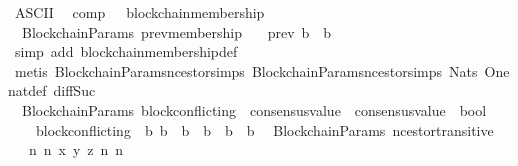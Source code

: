 \begin{isabellebody}
\isanewline
{}\isamarkupfalse%
\ {\isacharparenleft}ASCII{\isacharparenright}\isanewline
\ \ comp\ \ {\isacharparenleft}\ {\isachardoublequoteopen}blockchain{\isacharunderscore}membership{\isachardoublequoteclose}\ {}{}{\isacharparenright}\isanewline
\isanewline
{}\isamarkupfalse%
\ {\isacharparenleft}\ BlockchainParams{\isacharparenright}\ prev{\isacharunderscore}membership\ {\isacharcolon}\isanewline
\ \ {\isachardoublequoteopen}prev\ b\ {\isasymdownharpoonright}\ b{\isachardoublequoteclose}\isanewline
%
\isadelimproof
\ \ %
\endisadelimproof
%
\isatagproof
{}\isamarkupfalse%
\ {\isacharparenleft}simp\ add{\isacharcolon}\ blockchain{\isacharunderscore}membership{\isacharunderscore}def{\isacharparenright}\isanewline
\ \ \isamarkupfalse%
\ {\isacharparenleft}metis\ BlockchainParams{\isachardot}n{\isacharunderscore}cestor{\isachardot}simps{\isacharparenleft}{}{\isacharparenright}\ BlockchainParams{\isachardot}n{\isacharunderscore}cestor{\isachardot}simps{\isacharparenleft}{}{\isacharparenright}\ Nats{\isacharunderscore}{}\ One{\isacharunderscore}nat{\isacharunderscore}def\ diff{\isacharunderscore}Suc{\isacharunderscore}{}{\isacharparenright}%
\endisatagproof
{\isafoldproof}%
%
\isadelimproof
\ \isanewline
%
\endisadelimproof
\isanewline
{}\isamarkupfalse%
\ {\isacharparenleft}\ BlockchainParams{\isacharparenright}\ block{\isacharunderscore}conflicting\ {\isacharcolon}{\isacharcolon}\ {\isachardoublequoteopen}{\isacharparenleft}consensus{\isacharunderscore}value\ {\isacharasterisk}\ consensus{\isacharunderscore}value{\isacharparenright}\ {\isasymRightarrow}\ bool{\isachardoublequoteclose}\isanewline
\ \ \isanewline
\ \ \ \ {\isachardoublequoteopen}block{\isacharunderscore}conflicting\ {\isacharequal}\ {\isacharparenleft}{\isasymlambda}{\isacharparenleft}b{}{\isacharcomma}\ b{}{\isacharparenright}{\isachardot}\ {\isasymnot}\ {\isacharparenleft}b{}\ {\isasymdownharpoonright}\ b{}\ {\isasymor}\ b{}\ {\isasymdownharpoonright}\ b{}{\isacharparenright}{\isacharparenright}{\isachardoublequoteclose}\isanewline
\isanewline
{}\isamarkupfalse%
\ {\isacharparenleft}\ BlockchainParams{\isacharparenright}\ n{\isacharunderscore}cestor{\isacharunderscore}transitive\ {\isacharcolon}\isanewline
\ \ {\isachardoublequoteopen}{\isasymforall}\ n{}\ n{}\ x\ y\ z{\isachardot}\ {\isacharbraceleft}n{}{\isacharcomma}\ n{}{\isacharbraceright}\ {\isasymsubseteq}\ {\isasymnat}\ \isanewline

\end{isabellebody}
